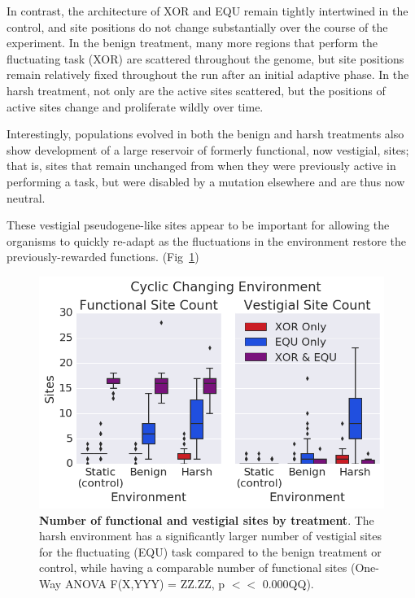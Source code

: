 \documentclass[10pt,letterpaper]{article}
\begin{document}
In contrast, the architecture of XOR and EQU remain tightly intertwined in the control, and site positions do not change substantially over the course of the experiment. In the benign treatment, many more regions that perform the fluctuating task (XOR) are scattered throughout the genome, but site positions remain relatively fixed throughout the run after an initial adaptive phase. In the harsh treatment, not only are the active sites scattered, but the positions of active sites change and proliferate wildly over time.

Interestingly, populations evolved in both the benign and harsh treatments also show development of a large reservoir of formerly functional, now vestigial, sites; that is, sites that remain unchanged from when they were previously active in performing a task, but were disabled by a mutation elsewhere and are thus now neutral.

These vestigial pseudogene-like sites appear to be important for allowing the organisms to quickly re-adapt as the fluctuations in the environment restore the previously-rewarded functions. (Fig~\ref{fig:CCE_func_vestigial})
\begin{figure}[!h]
\includegraphics[trim={0 0 0 0}, clip, width=1\columnwidth]{figures/CCE_func_vest__box.png}
\caption{{\bf Number of functional and vestigial sites by treatment}. The harsh environment has a significantly larger number of vestigial sites for the fluctuating (EQU) task compared to the benign treatment or control, while having a comparable number of functional sites (One-Way ANOVA F(X,YYY) = ZZ.ZZ, p $<<$ 0.000QQ).%
}
\label{fig:CCE_func_vestigial} %
\end{figure}
\end{document}
